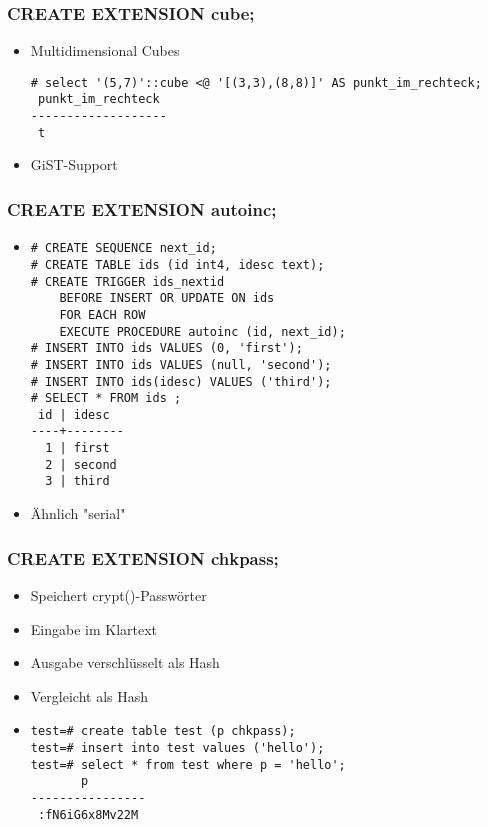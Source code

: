 \documentclass[utf8,hyperref={pdftex,colorlinks,linkcolor=black,citecolor=black,urlcolor=black,filecolor=black,plainpages=false},xcolor=table,hyperref]{beamer}
\begin{document}
\begin{frame}[containsverbatim]
	\frametitle{CREATE EXTENSION cube;}
	\begin{itemize}
		\item Multidimensional Cubes
			\begin{verbatim}
# select '(5,7)'::cube <@ '[(3,3),(8,8)]' AS punkt_im_rechteck;
 punkt_im_rechteck 
-------------------
 t
 \end{verbatim}
 \item GiST-Support
 \end{itemize}

\end{frame}

\begin{frame}[containsverbatim]
	\frametitle{CREATE EXTENSION autoinc;}
	\begin{itemize}
		\item 
	\begin{verbatim}
# CREATE SEQUENCE next_id;
# CREATE TABLE ids (id int4, idesc text);
# CREATE TRIGGER ids_nextid
    BEFORE INSERT OR UPDATE ON ids
    FOR EACH ROW
    EXECUTE PROCEDURE autoinc (id, next_id);
# INSERT INTO ids VALUES (0, 'first');
# INSERT INTO ids VALUES (null, 'second');
# INSERT INTO ids(idesc) VALUES ('third');
# SELECT * FROM ids ;
 id | idesc  
----+--------
  1 | first
  2 | second
  3 | third
\end{verbatim}
\item Ähnlich "{}serial"
	\end{itemize}
\end{frame}

\begin{frame}[containsverbatim]
	\frametitle{CREATE EXTENSION chkpass;}
	\begin{itemize}
		\item Speichert crypt()-Passwörter
		\item Eingabe im Klartext
		\item Ausgabe verschlüsselt als Hash
		\item Vergleicht als Hash
		\item 
			\begin{verbatim}
test=# create table test (p chkpass);
test=# insert into test values ('hello');
test=# select * from test where p = 'hello';
       p        
----------------
 :fN6iG6x8Mv22M
 \end{verbatim}
 \end{itemize}
\end{frame}
\end{document}
